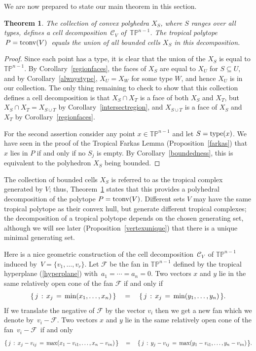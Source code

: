 \documentclass[11pt]{amsart}
\newtheorem{thm}{Theorem}
\newcommand{\TP}{\mathbb{TP}}
\begin{document}
We are now prepared to state our main theorem in this section.

\begin{thm}\label{celldecomp}
The collection of convex polyhedra $X_S$, where $S$ ranges over all types, defines
a cell decomposition $ \,{\mathcal C}_V$ of $\,\TP^{n-1}$.
The tropical polytope $\, P = {\rm tconv}(V)\,$ equals
the union of all bounded cells $X_S$ in this decomposition.
\end{thm}

\begin{proof}
Since each point has a type, it is clear that the union of the $X_S$ is 
equal to $\TP^{n-1}$. By Corollary~\ref{regionfaces}, the faces of $X_S$ are equal to $X_U$ for $S\subseteq U$, and 
by Corollary~\ref{alwaystype}, $X_U=X_W$ for some type $W$, and hence $X_U$ is in our collection. The only thing 
remaining to check to show that this collection defines a cell decomposition is that $X_S\cap X_T$ is a face of both 
$X_S$ and $X_T$, but $X_S\cap X_T=X_{S\cup T}$ by Corollary~\ref{intersectregion}, and $X_{S\cup T}$ is a face of 
$X_S$ and $X_T$ by Corollary~\ref{regionfaces}.

For the second assertion consider any point
$x \in \TP^{n-1}$ and let $S = {\rm type}(x)$.
We have seen in the proof of the
Tropical Farkas Lemma (Proposition~\ref{farkas})
that $x $ lies in $P$ if and only if no $S_j $ is empty.
By Corollary~\ref{boundedness}, this is equivalent to
the polyhedron $X_S$ being bounded.
\end{proof}

The collection of bounded cells $X_S$ is referred to as the tropical complex generated by $V$; thus, 
Theorem~\ref{celldecomp} states that this provides a polyhedral decomposition of the polytope $P={\rm 
tconv}(V)$. 
Different sets $V$ may 
have the same tropical polytope as their convex hull, but generate different tropical complexes; the decomposition 
of a tropical polytope depends on the chosen generating set, although we will see later 
(Proposition~\ref{vertexunique}) that there is a unique minimal generating set.

Here is a nice geometric construction of
the cell decomposition $\, {\mathcal C}_V \,$
of $\TP^{n-1}$ induced by $\, V = \{v_1,\ldots,v_r\}$.
Let ${\mathcal F}$ be the fan in $\TP^{n-1}$
defined by the tropical hyperplane (\ref{hyperplane})
with  $\,a_1 = \cdots = a_n = 0$. 
Two vectors $x$ and $y$ lie in the same
relatively open cone of the fan ${\mathcal F}$
if and only if
$$ \{\, j \,: \, x_j \, = \, {\rm min}(x_1,\ldots,x_n) \,\}
\quad = \quad 
\{\, j \,: \, x_j \, = \, {\rm min}(y_1,\ldots,y_n) \,\}. $$
If we translate the negative of ${\mathcal F}$
by the vector $v_i$ then we get a new fan which we denote by
$\, v_i - {\mathcal F} $. 
Two vectors $x$ and $y$ lie in the same
relatively open cone of the fan  $\, v_i - {\mathcal F} \,$
if and only
$$ \{\, j \,: \, x_j-v_{ij}\, = \, {\rm max}(x_1-v_{i1},\ldots,x_n-v_{in}) \,\}
\quad = \quad 
\{\, j \,: \, y_j-v_{ij} \, = \, {\rm max}(y_1-v_{i1},\ldots,y_n-v_{in}) \,\}. $$
\end{document}
